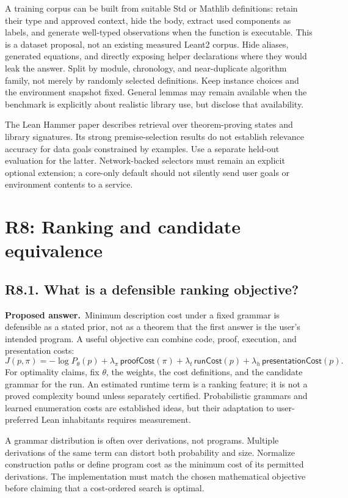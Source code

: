 \documentclass[11pt,a4paper]{article}
\newcommand{\question}[2]{\subsection{#1. #2}\label{q:#1}}
\newcommand{\answer}{\textbf{Proposed answer.}\ }
\theoremstyle{remark}
\begin{document}
A training corpus can be built from suitable Std or Mathlib definitions:
retain their type and approved context, hide the body, extract used
components as labels, and generate well-typed observations when the function
is executable. This is a dataset proposal, not an existing measured
Leant2 corpus. Hide aliases, generated equations, and directly exposing
helper declarations where they would leak the answer. Split by module,
chronology, and near-duplicate algorithm family, not merely by randomly
selected definitions. Keep instance choices and the environment snapshot
fixed. General lemmas may remain available when the benchmark is explicitly
about realistic library use, but disclose that availability.

The Lean Hammer paper describes retrieval over theorem-proving states and
library signatures. Its strong premise-selection results do not establish
relevance accuracy for data goals constrained by examples.\cite{leanhammer}
Use a separate held-out evaluation for the latter. Network-backed selectors
must remain an explicit optional extension; a core-only default should not
silently send user goals or environment contents to a service.

\section{R8: Ranking and candidate equivalence}
\label{sec:r8}

\question{R8.1}{What is a defensible ranking objective?}

\answer Minimum description cost under a fixed grammar is defensible as a
stated prior, not as a theorem that the first answer is the user's intended
program. A useful objective can combine code, proof, execution, and
presentation costs:
\begin{equation}\label{eq:ranking}
 J(p,\pi)=-\log P_{\theta}(p)
 +\lambda_{\pi}\,\mathsf{proofCost}(\pi)
 +\lambda_t\,\mathsf{runCost}(p)
 +\lambda_h\,\mathsf{presentationCost}(p).
\end{equation}
For optimality claims, fix $\theta$, the weights, the cost definitions, and
the candidate grammar for the run. An estimated runtime term is a ranking
feature; it is not a proved complexity bound unless separately certified.
Probabilistic grammars and learned enumeration costs are established ideas,
but their adaptation to user-preferred Lean inhabitants requires
measurement.\cite{probe}

A grammar distribution is often over derivations, not programs. Multiple
derivations of the same term can distort both probability and size.
Normalize construction paths or define program cost as the minimum cost of
its permitted derivations. The implementation must match the chosen
mathematical objective before claiming that a cost-ordered search is optimal.
\end{document}
